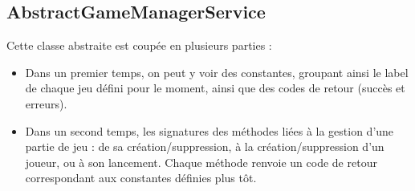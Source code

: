 \documentclass{article}
\begin{document}
        \subsection{AbstractGameManagerService}
            Cette classe abstraite est coupée en plusieurs parties :\\
            \begin{itemize}
                \item Dans un premier temps, on peut y voir des constantes, groupant ainsi le label de chaque jeu défini pour le moment, ainsi que des codes de retour (succès et erreurs).
                \item Dans un second temps, les signatures des méthodes liées à la gestion d'une partie de jeu : de sa création/suppression, à la création/suppression d'un joueur, ou à son lancement. Chaque méthode renvoie un code de retour correspondant aux constantes définies plus tôt.
            \end{itemize}
\end{document}
